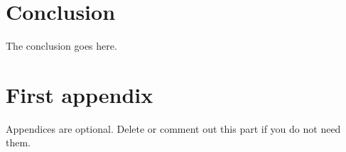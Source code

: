 \documentclass[journal]{IEEEtran}
\begin{document}
\section{Conclusion}
The conclusion goes here.






\appendices
\section{First appendix}
Appendices are optional. Delete or comment out this part if you do not need them.


\end{document}

